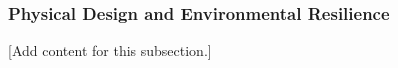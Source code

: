 
\subsubsection{Physical Design and Environmental Resilience}
\label{subsubsec:design_5_1_physical_design_environmental_resilience}

[Add content for this subsection.]
